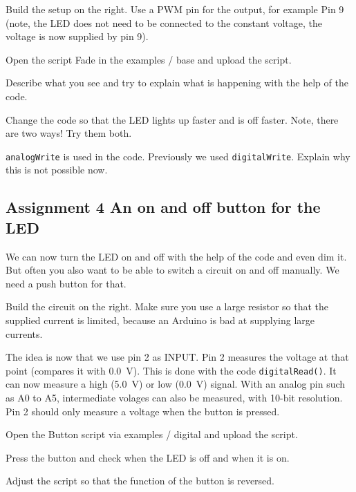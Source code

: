 \documentclass{arduino}
\begin{document}
\begin{alphalist}
\item Build the setup on the right. Use a PWM pin for the output, for example Pin 9 (note, the LED does not need to be connected to the constant voltage, the voltage is now supplied by pin 9).

\item Open the script Fade in the examples / base and upload the script.

\item Describe what you see and try to explain what is happening with the help of the code.

\item Change the code so that the LED lights up faster and is off faster. Note, there are two ways! Try them both.

\item \lstinline{analogWrite} is used in the code. Previously we used \lstinline{digitalWrite}. Explain why this is not possible now.
\end{alphalist}

\subsection{Assignment 4 An on and off button for the LED}


We can now turn the LED on and off with the help of the code and even dim it. But often you also want to be able to switch a circuit on and off manually. We need a push button for that.

\begin{alphalist}
\item Build the circuit on the right. Make sure you use a large resistor so that the supplied current is limited, because an Arduino is bad at supplying large currents.
\end{alphalist}

The idea is now that we use pin 2 as INPUT. Pin 2 measures the voltage at that point (compares it with \SI{0.0}{\volt}). This is done with the code \lstinline{digitalRead()}. It can now measure a high (\SI{5.0}{\volt}) or low (\SI{0.0}{\volt}) signal. With an analog pin such as A0 to A5, intermediate volages can also be measured, with 10-bit resolution. Pin 2 should only measure a voltage when the button is pressed.

\begin{alphalist}
\item Open the Button script via examples / digital and upload the script.

\item Press the button and check when the LED is off and when it is on.

\item Adjust the script so that the function of the button is reversed.
\end{alphalist}
\end{document}
